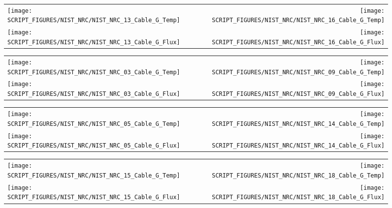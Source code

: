 \begin{figure}[p]
\begin{tabular*}{\textwidth}{l@{\extracolsep{\fill}}r}
\texttt{[image: SCRIPT\_FIGURES/NIST\_NRC/NIST\_NRC\_13\_Cable\_G\_Temp]} &
\texttt{[image: SCRIPT\_FIGURES/NIST\_NRC/NIST\_NRC\_16\_Cable\_G\_Temp]} \\
\texttt{[image: SCRIPT\_FIGURES/NIST\_NRC/NIST\_NRC\_13\_Cable\_G\_Flux]} &
\texttt{[image: SCRIPT\_FIGURES/NIST\_NRC/NIST\_NRC\_16\_Cable\_G\_Flux]}
\end{tabular*}
\label{NIST_NRC_G_13_and_16}
\end{figure}

\clearpage

\begin{figure}[p]
\begin{tabular*}{\textwidth}{l@{\extracolsep{\fill}}r}
\texttt{[image: SCRIPT\_FIGURES/NIST\_NRC/NIST\_NRC\_03\_Cable\_G\_Temp]} &
\texttt{[image: SCRIPT\_FIGURES/NIST\_NRC/NIST\_NRC\_09\_Cable\_G\_Temp]} \\
\texttt{[image: SCRIPT\_FIGURES/NIST\_NRC/NIST\_NRC\_03\_Cable\_G\_Flux]} &
\texttt{[image: SCRIPT\_FIGURES/NIST\_NRC/NIST\_NRC\_09\_Cable\_G\_Flux]}
\end{tabular*}
\label{NIST_NRC_G_3_and_9}
\end{figure}

\begin{figure}[p]
\begin{tabular*}{\textwidth}{l@{\extracolsep{\fill}}r}
\texttt{[image: SCRIPT\_FIGURES/NIST\_NRC/NIST\_NRC\_05\_Cable\_G\_Temp]} &
\texttt{[image: SCRIPT\_FIGURES/NIST\_NRC/NIST\_NRC\_14\_Cable\_G\_Temp]} \\
\texttt{[image: SCRIPT\_FIGURES/NIST\_NRC/NIST\_NRC\_05\_Cable\_G\_Flux]} &
\texttt{[image: SCRIPT\_FIGURES/NIST\_NRC/NIST\_NRC\_14\_Cable\_G\_Flux]}
\end{tabular*}
\label{NIST_NRC_G_5_and_14}
\end{figure}

\clearpage

\begin{figure}[p]
\begin{tabular*}{\textwidth}{l@{\extracolsep{\fill}}r}
\texttt{[image: SCRIPT\_FIGURES/NIST\_NRC/NIST\_NRC\_15\_Cable\_G\_Temp]} &
\texttt{[image: SCRIPT\_FIGURES/NIST\_NRC/NIST\_NRC\_18\_Cable\_G\_Temp]} \\
\texttt{[image: SCRIPT\_FIGURES/NIST\_NRC/NIST\_NRC\_15\_Cable\_G\_Flux]} &
\texttt{[image: SCRIPT\_FIGURES/NIST\_NRC/NIST\_NRC\_18\_Cable\_G\_Flux]}
\end{tabular*}
\label{NIST_NRC_G_15_and_18}
\end{figure}

